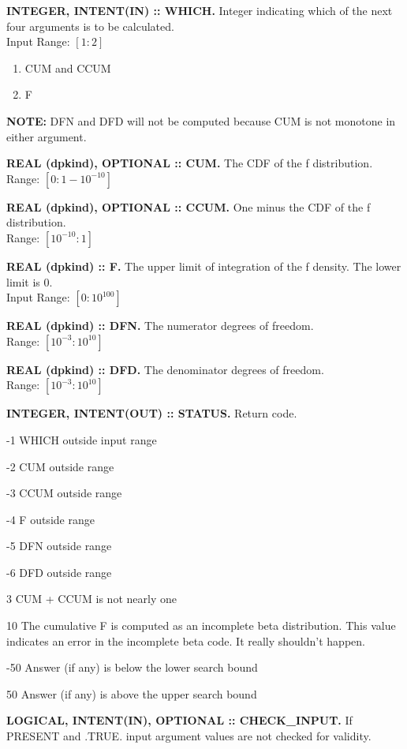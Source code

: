 \documentclass[12pt,dvips]{article}
\newcommand{\range}[2]{\hfill Range: \ensuremath{\left[ #1:#2
\right]}\\}
\newcommand{\inrange}[2]{\hfill Input Range: \ensuremath{\left[ #1:#2
\right]}\\}
\newcommand{\sdf}{10^{-3}}
\newcommand{\bdf}{10^{10}}
\newcommand{\sprob}{10^{-10}}
\newcommand{\bprob}{1-\sprob}
\newcommand{\immense}{10^{100}}
\newcommand{\myitem}[1]{\item{\bf \color{Violet} #1 \normalcolor}}
\begin{document}
\begin{description}

\myitem{INTEGER, INTENT(IN)  :: WHICH.} Integer indicating  which of the
next four arguments is to be calculated.\\
\inrange{1}{2}
\begin{enumerate}
\item CUM and CCUM
\item F
\end{enumerate}

{\bf  NOTE:} DFN  and DFD  will  not be  computed because  CUM is  not
monotone in either argument.

\myitem{REAL (dpkind), OPTIONAL :: CUM.} The CDF of the f distribution.\\
\range{0}{\bprob}

\myitem{REAL (dpkind), OPTIONAL :: CCUM.} One minus the CDF of the
f distribution.\\
\range{\sprob}{1}

\myitem{REAL (dpkind) :: F.}  The upper limit of integration of
the f density.  The lower limit is 0.\\
\inrange{0}{\immense}

\myitem{REAL (dpkind) :: DFN.}  The numerator degrees of
freedom.\\
\range{\sdf}{\bdf}

\myitem{REAL (dpkind) :: DFD.}  The denominator degrees of freedom.\\
\range{\sdf}{\bdf}

\myitem{INTEGER, INTENT(OUT) :: STATUS.} Return code.
\begin{description}
\item{-1}  WHICH outside input range
\item{-2}  CUM outside range
\item{-3}  CCUM outside range
\item{-4}  F outside range
\item{-5}  DFN outside range
\item{-6}  DFD outside range
\item{3} CUM + CCUM is not nearly one
\item{10} The cumulative F is computed as an incomplete
beta distribution.  This value indicates an error in the incomplete
beta code.  It really shouldn't happen.
\item{-50} Answer (if any) is below the lower search bound
\item{50} Answer (if any) is above the upper search bound
\end{description}

\myitem{LOGICAL, INTENT(IN), OPTIONAL :: CHECK\_INPUT.}  If PRESENT
and .TRUE. input argument values are not checked for validity.

\end{description}
\end{document}
